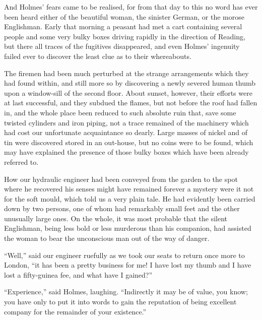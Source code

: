 \documentclass{article}
\begin{document}
And Holmes' fears came to be realised, for from that day to this no word
has ever been heard either of the beautiful woman, the sinister German,
or the morose Englishman. Early that morning a peasant had met a cart
containing several people and some very bulky boxes driving rapidly in the
direction of Reading, but there all traces of the fugitives disappeared,
and even Holmes' ingenuity failed ever to discover the least clue as to
their whereabouts.

The firemen had been much perturbed at the strange arrangements which
they had found within, and still more so by discovering a newly severed
human thumb upon a window-sill of the second floor. About sunset,
however, their efforts were at last successful, and they subdued the
flames, but not before the roof had fallen in, and the whole place been
reduced to such absolute ruin that, save some twisted cylinders and
iron piping, not a trace remained of the machinery which had cost our
unfortunate acquaintance so dearly. Large masses of nickel and of tin
were discovered stored in an out-house, but no coins were to be found,
which may have explained the presence of those bulky boxes which have
been already referred to.

How our hydraulic engineer had been conveyed from the garden to the
spot where he recovered his senses might have remained forever a mystery
were it not for the soft mould, which told us a very plain tale. He had
evidently been carried down by two persons, one of whom had remarkably
small feet and the other unusually large ones. On the whole, it was most
probable that the silent Englishman, being less bold or less murderous
than his companion, had assisted the woman to bear the unconscious man
out of the way of danger.

``Well,'' said our engineer ruefully as we took our seats to return once
more to London, ``it has been a pretty business for me! I have lost my
thumb and I have lost a fifty-guinea fee, and what have I gained?''

``Experience,'' said Holmes, laughing. ``Indirectly it may be of value,
you know; you have only to put it into words to gain the reputation of
being excellent company for the remainder of your existence.''
\end{document}
